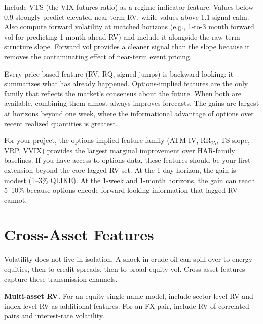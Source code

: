 \begin{projectconnection}
Include VTS (the VIX futures ratio) as a regime indicator feature.
Values below 0.9 strongly predict elevated near-term RV, while values above 1.1 signal calm.
Also compute forward volatility at matched horizons (e.g., 1-to-3 month forward vol for predicting 1-month-ahead RV) and include it alongside the raw term structure slope.
Forward vol provides a cleaner signal than the slope because it removes the contaminating effect of near-term event pricing.
\end{projectconnection}

\begin{keyidea}
Every price-based feature (RV, RQ, signed jumps) is backward-looking: it summarizes what has already happened.
Options-implied features are the only family that reflects the market's consensus about the future.
When both are available, combining them almost always improves forecasts.
The gains are largest at horizons beyond one week, where the informational advantage of options over recent realized quantities is greatest.
\end{keyidea}

\begin{projectconnection}
For your project, the options-implied feature family (ATM IV, RR$_{25}$, TS slope, VRP, VVIX) provides the largest marginal improvement over HAR-family baselines. If you have access to options data, these features should be your first extension beyond the core lagged-RV set. At the 1-day horizon, the gain is modest (1--3\% QLIKE). At the 1-week and 1-month horizons, the gain can reach 5--10\% because options encode forward-looking information that lagged RV cannot.
\end{projectconnection}

\section{Cross-Asset Features}\label{sec:feat-cross}

Volatility does not live in isolation.
A shock in crude oil can spill over to energy equities, then to credit spreads, then to broad equity vol.
Cross-asset features capture these transmission channels.

\textbf{Multi-asset RV.}
For an equity single-name model, include sector-level RV and index-level RV as additional features.
For an FX pair, include RV of correlated pairs and interest-rate volatility.

